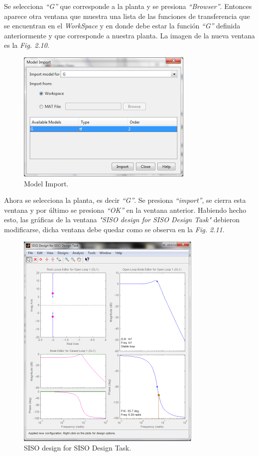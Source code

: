 \documentclass[a4paper,12pt,twoside]{proyectotanquesecci}
\begin{document}
Se selecciona \textit{“G”} que corresponde a la planta y se presiona \textit{“Browser”}. Entonces aparece otra ventana que muestra una lista de las funciones de transferencia que se encuentran en el \textit{WorkSpace} y en donde debe estar la función \textit{“G”} definida anteriormente y que corresponde a nuestra planta. La imagen de la nueva ventana es la \textit{Fig. 2.10}. \\

\begin{figure}[h]
\centering
\includegraphics[scale=0.7]{Ventana4}
\renewcommand{\figurename}{Fig.}
\caption{Model Import.}
\label{Model Import.}
\end{figure}

Ahora se selecciona la planta, es decir \textit{“G”}. Se presiona \textit{“import”}, se cierra esta ventana y por último se presiona \textit{“OK”} en la ventana anterior. Habiendo hecho esto, las gráficas de la ventana \textit{"SISO design for SISO Design Task"} debieron modificarse, dicha ventana debe quedar como se observa en la \textit{Fig. 2.11}. \\

\begin{figure}[h]
\centering
\includegraphics[scale=0.7]{Ventana5}
\renewcommand{\figurename}{Fig.}
\caption{SISO design for SISO Design Task.}
\label{SISO design for SISO Design Task.}
\end{figure}
\end{document}
